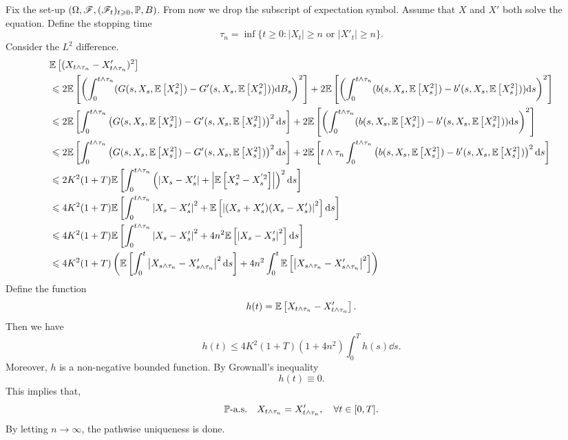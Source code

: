 \documentclass[8pt,onesided]{article}
\begin{document}
Fix the set-up $(\Omega, \mathscr{F},(\mathscr{F}_t)_{t\geqslant 0},\mathbb{P},B)$. From now we drop the subscript of expectation symbol. Assume that $X$ and $X'$ both solve the equation. Define the stopping time
\begin{equation*}
    \tau_n=\inf\{t\ge 0:|X_t| \ge n \text{ or } |X'_t|\ge n\}.
\end{equation*}
Consider the $L^2$ difference.
\begin{align*}
&\mathbb{E}\left[(X_{t\wedge \tau_n}-X'_{t\wedge \tau_n})^2\right]\\
&\leqslant 2\mathbb{E}\left[\left( \int_0^{t\wedge \tau_n}(G(s,X_s,\mathbb{E}\left[X_s^2\right])-G'(s,X_s,\mathbb{E}\left[X_s^2\right]))\dd B_s \right)^2\right]  +2\mathbb{E}\left[\left( \int_0^{t\wedge \tau_n}(b(s,X_s,\mathbb{E}\left[X_s^2\right])-b'(s,X_s,\mathbb{E}\left[X_s^2\right]))\dd s \right)^2\right] \\
&\leqslant 2\mathbb{E}\left[ \int_0^{t\wedge \tau_n}\left(G(s,X_s,\mathbb{E}\left[X_s^2\right])-G'(s,X_s,\mathbb{E}\left[X_s^2\right])\right)^2\dd s\right] + 2\mathbb{E}\left[\left( \int_0^{t\wedge \tau_n}(b(s,X_s,\mathbb{E}\left[X_s^2\right])-b'(s,X_s,\mathbb{E}\left[X_s^2\right]))\dd s \right)^2\right] \\
&\leqslant 2\mathbb{E}\left[ \int_0^{t\wedge \tau_n}\left(G(s,X_s,\mathbb{E}\left[X_s^2\right])-G'(s,X_s,\mathbb{E}\left[X_s^2\right])\right)^2\dd s\right] +2\mathbb{E}\left[{t\wedge \tau_n}\int_0^{t\wedge \tau_n}\left(b(s,X_s,\mathbb{E}\left[X_s^2\right])-b'(s,X_s,\mathbb{E}\left[X_s^2\right])\right)^2\dd s\right]\\
&\leqslant 2K^2 (1+T)\mathbb{E}\left[\int_0^{t\wedge \tau_n}\left(\left|X_s-X'_s\right|+\left|\mathbb{E}\left[X_s^2-X_s^{'2}\right]\right|\right)^2 \dd s\right] \\
&\leqslant 4K^2(1+T) \mathbb{E}\left[\int_0^{t\wedge \tau_n}\left|X_s-X'_s\right|^2+\mathbb{E}\left[\left|(X_s+X'_s)(X_s-X'_s)\right|^2\right] \dd s\right]\\
&\leqslant 4K^2(1+T) \mathbb{E}\left[ \int_0^{t\wedge \tau_n}   \left|X_s-X'_s\right|^2+ 4n^2 \mathbb{E}\left[\left|X_s-X'_s\right|^2\right] \dd s\right]\\
&\leqslant 4K^2 (1+T)\left( \mathbb{E}\left[\int_0^{t} \left|X_{s\wedge \tau_n}-X'_{s\wedge \tau_n}\right|^2\dd s\right]+4n^2\int_0^t \mathbb{E}\left[\left|X_{s\wedge \tau_n}-X'_{s\wedge \tau_n}\right|^2\right]\right)
\end{align*}
Define the function
\begin{equation*}
    h(t)=\mathbb{E}\left[X_{t\wedge \tau_n}-X'_{t\wedge \tau_n}\right].
\end{equation*}
Then we have
\begin{equation*}
    h(t)\le 4K^2(1+T)( 1+4n^2) \int_0^T h(s)\dd s. 
\end{equation*}
Moreover, $h$ is a non-negative bounded function. By Grownall's inequality
\begin{equation*}
    h(t)\equiv 0.
\end{equation*}
This implies that,
\begin{equation*}
    \mathbb{P}\text{-a.s.}\quad X_{t\wedge \tau_n}=X'_{t\wedge \tau_n}, \quad \forall t\in [0,T].
\end{equation*}
By letting $n\to \infty$, the pathwise uniqueness is done.
\end{document}
